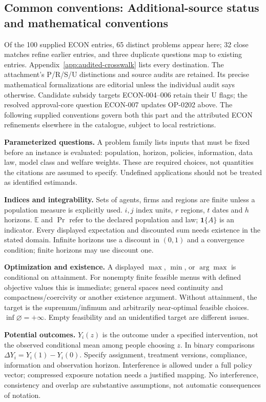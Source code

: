 \documentclass[11pt,a4paper]{article}
\begin{document}
\subsection*{Common conventions: Additional-source status and mathematical conventions}

\label{audited:conventions}

Of the 100 supplied ECON entries, 65 distinct problems appear here; 32 close
matches refine earlier entries, and three duplicate questions map to existing
entries. Appendix~\ref{app:audited-crosswalk} lists every destination.
The attachment's P/R/S/U distinctions and source audits are retained. Its
precise mathematical formalizations are editorial unless the individual audit
says otherwise. Candidate subsidy targets ECON-004--006 retain their U flags;
the resolved approval-core question ECON-007 updates OP-0202 above.
The following supplied conventions govern both this part and the attributed
ECON refinements elsewhere in the catalogue, subject to local restrictions.

\textbf{Parameterized questions.} A problem family lists inputs that must be fixed before an instance is evaluated: population, horizon, policies, information, data law, model class and welfare weights. These are required choices, not quantities the citations are assumed to specify. Undefined applications should not be treated as identified estimands.

\textbf{Indices and integrability.} Sets of agents, firms and regions are finite unless a population measure is explicitly used. \(i,j\) index units, \(r\) regions, \(t\) dates and \(h\) horizons. \(\mathbb E\) and \(\Pr\) refer to the declared population and law; \(\mathbf1\{A\}\) is an indicator. Every displayed expectation and discounted sum needs existence in the stated domain. Infinite horizons use a discount in \((0,1)\) and a convergence condition; finite horizons may use discount one.

\textbf{Optimization and existence.} A displayed \(\max\), \(\min\), or \(\arg\max\) is conditional on attainment. For nonempty finite feasible menus with defined objective values this is immediate; general spaces need continuity and compactness/coercivity or another existence argument. Without attainment, the target is the supremum/infimum and arbitrarily near-optimal feasible choices. \(\inf\varnothing=+\infty\). Empty feasibility and an unidentified target are different issues.

\textbf{Potential outcomes.} \(Y_i(z)\) is the outcome under a specified intervention, not the observed conditional mean among people choosing \(z\). In binary comparisons \(\Delta Y_i=Y_i(1)-Y_i(0)\). Specify assignment, treatment versions, compliance, information and observation horizon. Interference is allowed under a full policy vector; compressed exposure notation needs a justified mapping. No interference, consistency and overlap are substantive assumptions, not automatic consequences of notation.
\end{document}
